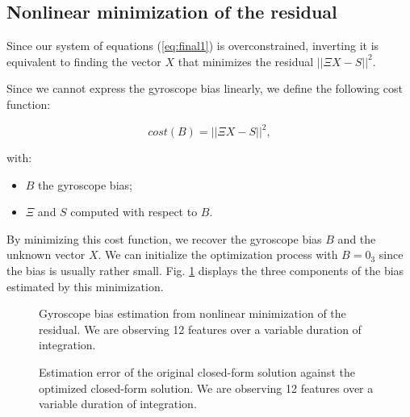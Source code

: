 \documentclass[letterpaper, 10 pt, journal, final]{ieeeconf}  %
\begin{document}
\subsection{Nonlinear minimization of the residual}

Since our system of equations (\ref{eq:final1}) is overconstrained,
inverting it is equivalent to finding the vector $X$ that minimizes the residual $||\Xi X - S||^2$.

Since we cannot express the gyroscope bias linearly,
we define the following cost function:

\begin{equation}
  \label{eq:cost}
  cost(B) = ||\Xi X - S||^2,
\end{equation}

\noindent with:
\begin{itemize}
\item $B$ the gyroscope bias;
\item $\Xi$ and $S$ computed with respect to $B$.
\end{itemize}

By minimizing this cost function, we recover the gyroscope bias $B$ and the unknown vector $X$.
We can initialize the optimization process with $B = 0_3$ since the bias is usually rather small. Fig. \ref{fig:gBiasEstimate} displays the three components of the bias estimated by this minimization.

\begin{figure}
  \centering
  \resizebox{0.7\columnwidth}{!}{}
  \caption{Gyroscope bias estimation from nonlinear minimization of the residual. We are observing 12 features  over a variable duration of integration. \label{fig:gBiasEstimate}}
\end{figure}

\begin{figure}
   \centering
   \resizebox{0.7\columnwidth}{!}{}
                \caption{Estimation error of the original closed-form solution against the optimized closed-form solution.  We are observing 12 features  over a variable duration of integration. \label{fig:optEstimate}}
\end{figure}
\end{document}
